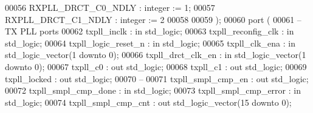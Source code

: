 \begin{DoxyCode}
00056       \textcolor{vhdlchar}{RXPLL_DRCT_C0_NDLY}            \textcolor{vhdlchar}{:} \textcolor{comment}{integer}   \textcolor{vhdlchar}{:=} \textcolor{vhdllogic}{}\textcolor{vhdllogic}{1};
00057       \textcolor{vhdlchar}{RXPLL_DRCT_C1_NDLY}            \textcolor{vhdlchar}{:} \textcolor{comment}{integer}   \textcolor{vhdlchar}{:=} \textcolor{vhdllogic}{}\textcolor{vhdllogic}{2}
00058 
00059    \textcolor{vhdlchar}{)};
00060    \textcolor{keywordflow}{port} \textcolor{vhdlchar}{(}
00061 \textcolor{keyword}{      -- TX PLL ports}
00062       \textcolor{vhdlchar}{txpll_inclk}          \textcolor{vhdlchar}{:} \textcolor{keywordflow}{in}  \textcolor{comment}{std\_logic};
00063       \textcolor{vhdlchar}{txpll_reconfig_clk}   \textcolor{vhdlchar}{:} \textcolor{keywordflow}{in}  \textcolor{comment}{std\_logic};
00064       \textcolor{vhdlchar}{txpll_logic_reset_n}  \textcolor{vhdlchar}{:} \textcolor{keywordflow}{in}  \textcolor{comment}{std\_logic};
00065       \textcolor{vhdlchar}{txpll_clk_ena}        \textcolor{vhdlchar}{:} \textcolor{keywordflow}{in}  \textcolor{comment}{std\_logic\_vector}\textcolor{vhdlchar}{(}\textcolor{vhdllogic}{}\textcolor{vhdllogic}{1} \textcolor{keywordflow}{downto} \textcolor{vhdllogic}{}\textcolor{vhdllogic}{0}\textcolor{vhdlchar}{)};
00066       \textcolor{vhdlchar}{txpll_drct_clk_en}    \textcolor{vhdlchar}{:} \textcolor{keywordflow}{in}  \textcolor{comment}{std\_logic\_vector}\textcolor{vhdlchar}{(}\textcolor{vhdllogic}{}\textcolor{vhdllogic}{1} \textcolor{keywordflow}{downto} \textcolor{vhdllogic}{}\textcolor{vhdllogic}{0}\textcolor{vhdlchar}{)};
00067       \textcolor{vhdlchar}{txpll_c0}             \textcolor{vhdlchar}{:} \textcolor{keywordflow}{out} \textcolor{comment}{std\_logic};
00068       \textcolor{vhdlchar}{txpll_c1}             \textcolor{vhdlchar}{:} \textcolor{keywordflow}{out} \textcolor{comment}{std\_logic};
00069       \textcolor{vhdlchar}{txpll_locked}         \textcolor{vhdlchar}{:} \textcolor{keywordflow}{out} \textcolor{comment}{std\_logic};
00070 \textcolor{keyword}{      --}
00071       \textcolor{vhdlchar}{txpll_smpl_cmp_en}    \textcolor{vhdlchar}{:} \textcolor{keywordflow}{out} \textcolor{comment}{std\_logic};
00072       \textcolor{vhdlchar}{txpll_smpl_cmp_done}  \textcolor{vhdlchar}{:} \textcolor{keywordflow}{in}  \textcolor{comment}{std\_logic};
00073       \textcolor{vhdlchar}{txpll_smpl_cmp_error} \textcolor{vhdlchar}{:} \textcolor{keywordflow}{in}  \textcolor{comment}{std\_logic};
00074       \textcolor{vhdlchar}{txpll_smpl_cmp_cnt}   \textcolor{vhdlchar}{:} \textcolor{keywordflow}{out} \textcolor{comment}{std\_logic\_vector}\textcolor{vhdlchar}{(}\textcolor{vhdllogic}{}\textcolor{vhdllogic}{15} \textcolor{keywordflow}{downto} \textcolor{vhdllogic}{}\textcolor{vhdllogic}{0}\textcolor{vhdlchar}{)};

\end{DoxyCode}
